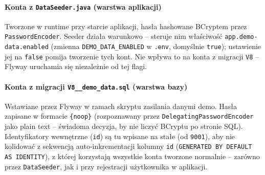 \documentclass[12pt,a4paper]{article}
\begin{document}
\paragraph{Konta z \texttt{DataSeeder.java} (warstwa aplikacji)}
Tworzone w runtime przy starcie aplikacji, hasła hashowane BCryptem
przez \texttt{PasswordEncoder}. Seeder działa warunkowo -- steruje nim
właściwość \texttt{app.demo-data.enabled} (zmienna \texttt{DEMO\_DATA\_ENABLED}
w \texttt{.env}, domyślnie \texttt{true}); ustawienie jej na \texttt{false}
pomija tworzenie tych kont. Nie wpływa to na konta z migracji \texttt{V8} --
Flyway uruchamia się niezależnie od tej flagi.


\begin{table}[H]
  \centering
  \small
\end{table}

\paragraph{Konta z migracji \texttt{V8\_\_demo\_data.sql} (warstwa bazy)}
Wstawiane przez Flyway w ramach skryptu zasilania danymi demo. Hasła zapisane
w formacie \texttt{\{noop\}} (rozpoznawany przez \texttt{DelegatingPasswordEncoder}
jako plain text -- świadoma decyzja, by nie liczyć BCryptu po stronie SQL).
Identyfikatory wewnętrzne (\texttt{id}) są tu wpisane na stałe (od \texttt{9001}),
aby nie kolidować z sekwencją auto-inkrementacji kolumny \texttt{id}
(\texttt{GENERATED BY DEFAULT AS IDENTITY}), z której korzystają wszystkie konta
tworzone normalnie -- zarówno przez \texttt{DataSeeder}, jak i przy rejestracji
użytkownika w aplikacji.
\end{document}
